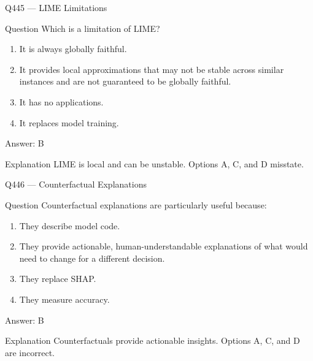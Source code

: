 \documentclass[aspectratio=169,8pt]{beamer}
\begin{document}
	\begin{frame}{Q445 --- LIME Limitations}
		\begin{block}{Question}
			Which is a limitation of LIME?
			\begin{enumerate}
				\item It is always globally faithful.
				\item It provides local approximations that may not be stable across similar instances and are not guaranteed to be globally faithful.
				\item It has no applications.
				\item It replaces model training.
			\end{enumerate}
		\end{block}
		\begin{exampleblock}{Answer: B}\end{exampleblock}
		\begin{block}{Explanation}
			LIME is local and can be unstable. Options A, C, and D misstate.
		\end{block}
	\end{frame}
	
	\begin{frame}{Q446 --- Counterfactual Explanations}
		\begin{block}{Question}
			Counterfactual explanations are particularly useful because:
			\begin{enumerate}
				\item They describe model code.
				\item They provide actionable, human-understandable explanations of what would need to change for a different decision.
				\item They replace SHAP.
				\item They measure accuracy.
			\end{enumerate}
		\end{block}
		\begin{exampleblock}{Answer: B}\end{exampleblock}
		\begin{block}{Explanation}
			Counterfactuals provide actionable insights. Options A, C, and D are incorrect.
		\end{block}
	\end{frame}
\end{document}
